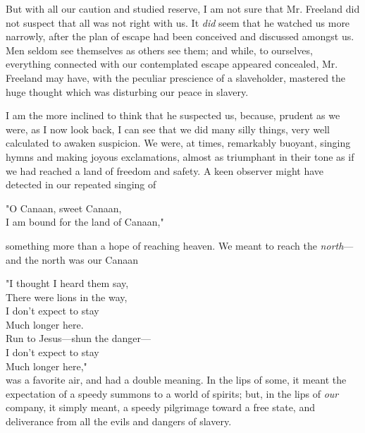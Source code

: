 But with all our caution and studied reserve, I am not sure that Mr.
Freeland did not suspect that all was not right with us. It \emph{did}
seem that he watched us more narrowly, after the plan of escape had been
conceived and discussed amongst us. Men seldom see themselves as others
see them; and while, to ourselves, everything connected with our
contemplated escape appeared concealed, Mr. Freeland may have, with the
peculiar prescience of a slaveholder, mastered the huge thought which
was disturbing our peace in slavery.

I am the more inclined to think that he suspected us, because, prudent
as we were, as I now look back, I can see that we did many silly things,
very well calculated to awaken suspicion. We were, at times, remarkably
buoyant, singing hymns and making joyous exclamations, almost as
triumphant in their tone as if we had reached a land of freedom and
safety. A keen observer might have detected in our repeated singing of

"O Canaan, sweet Canaan,\\
I am bound for the land of Canaan,"

something more than a hope of reaching heaven. We meant to reach the
\emph{north}---and the north was our Canaan

"I thought I heard them say,\\
There were lions in the way,\\
I don't expect to stay\\
{﻿}Much longer here.\\
{}Run to Jesus---shun the danger---\\
I don't expect to stay\\
{﻿}Much longer here,"\\

was a favorite air, and had a double meaning. In the lips of some, it
meant the expectation of a speedy summons to a world of spirits; but, in
the lips of \emph{our} company, it simply meant, a speedy pilgrimage
toward a free state, and deliverance from all the evils and dangers of
slavery.

